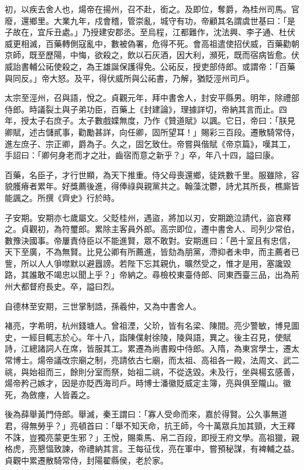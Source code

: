 \begin{pinyinscope}
 初，以疾去舍人也，煬帝在揚州，召不赴，銜之。及即位，奪爵，為桂州司馬。官廢，還鄉里。大業九年，戍會稽，管崇亂，城守有功，帝顧其名謂虞世基曰：「是子故在，宜斥丑處。」乃授建安郡丞。至烏程，江都難作，沈法興、李子通、杜伏威更相滅，百藥轉側寇亂中，數被偽署，危得不死。會高祖遣使招伏威，百藥勸朝京師，既至歷陽，中悔，欲殺之，飲以石灰酒，因大利，瀕死，既而宿病皆愈。伏威詒書輔公祏使殺之，為王雄誕保護得免。公祏反，授吏部侍郎。或謂帝：「百藥與同反。」帝大怒。及平，得伏威所與公祏書，乃解，猶貶涇州司戶。



 太宗至涇州，召與語，悅之。貞觀元年，拜中書舍人，封安平縣男。明年，除禮部侍郎。時議裂土與子弟功臣，百藥上《封建論》，理據詳切，帝納其言而止。四年，授太子右庶子。太子數戲媟無度，乃作《贊道賦》以諷。它日，帝曰：「朕見卿賦，述古儲貳事，勸勵甚詳，向任卿，固所望耳！」賜彩三百段。遷散騎常侍，進左庶子、宗正卿，爵為子。久之，固乞致仕。帝嘗與偕賦《帝京篇》，嘆其工，手詔曰：「卿何身老而才之壯，齒宿而意之新乎？」卒，年八十四，謚曰康。



 百藥，名臣子，才行世顯，為天下推重。侍父母喪還鄉，徒跣數千里。服雖除，容貌臒瘠者累年。好獎薦後進，得俸祿與親黨共之。翰藻沈鬱，詩尤其所長，樵廝皆能諷之。所撰《齊史》行於時。



 子安期。安期亦七歲屬文。父貶桂州，遇盜，將加以刃，安期跪泣請代，盜哀釋之。貞觀初，為符璽郎。累除主客員外郎。高宗即位，遷中書舍人、司列少常伯，數豫決國事。帝屢責侍臣以不能進賢，眾不敢對。安期進曰：「邑十室且有忠信，天下至廣，不為無賢。比見公卿有所薦進，皆劾為朋黨，滯抑者未申，而主薦者已訾，所以人人爭噤默以避囂謗。若陛下忘其親仇，曠然受之，惟才是用，塞讒毀路，其誰敢不竭忠以聞上乎？」帝納之。尋檢校東臺侍郎、同東西臺三品，出為荊州大都督府長史。卒，謚曰烈。



 自德林至安期，三世掌制誥，孫羲仲，又為中書舍人。



 褚亮，字希明，杭州錢塘人。曾祖湮，父玠，皆有名梁、陳間。亮少警敏，博見圖史，一經目輒志於心。年十八，詣陳僕射徐陵，陵與語，異之。後主召見，使賦詩，江總諸詞人在席，皆服其工。累遷為尚書殿中侍郎。入隋，為東宮學士，遷太常博士。煬帝議改宗廟之制，亮請依古七廟，而太祖、高祖各一殿，法周文、武二祧，與始祖而三，餘則分室而祭，始祖二祧，不從迭毀。未及行，坐與楊玄感善，煬帝矜己嫉才，因是亦貶西海司戶。時博士潘徽貶威定主簿，亮與俱至隴山。徽死，為斂瘞，人皆義之。



 後為薛舉黃門侍郎。舉滅，秦王謂曰：「寡人受命而來，嘉於得賢。公久事無道君，得無勞乎？」亮頓首曰：「舉不知天命，抗王師，今十萬眾兵加其頸，大王釋不誅，豈獨亮蒙更生邪？」王悅，賜乘馬、帛二百段，即授王府文學。高祖獵，親格虎，亮懇愊致諫，帝禮納其言。王每征伐，亮在軍中，嘗預秘謀，有裨輔之益。貞觀中累遷散騎常侍，封陽翟縣侯，老於家。




\end{pinyinscope}
